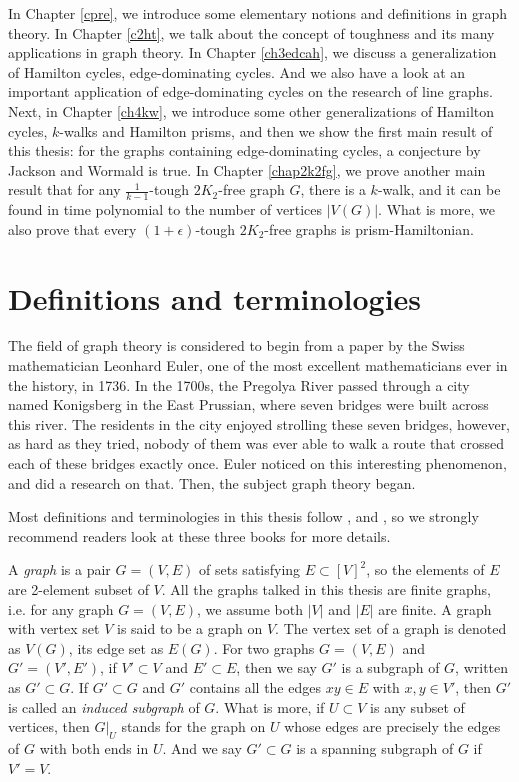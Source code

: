 \documentclass[12pt]{report}
\begin{document}
In Chapter \ref{cpre}, we introduce some elementary notions and definitions in graph theory. In Chapter \ref{c2ht}, we talk about the concept of toughness and its many applications in graph theory. In Chapter \ref{ch3edcah}, we discuss a generalization of Hamilton cycles, edge-dominating cycles. And we also have a look at an important application of edge-dominating cycles on the research of line graphs. Next, in Chapter \ref{ch4kw}, we introduce some other generalizations of Hamilton cycles, $k$-walks and Hamilton prisms, and then we show the first main result of this thesis: for the graphs containing edge-dominating cycles, a conjecture by Jackson and Wormald is true. In Chapter \ref{chap2k2fg}, we prove another main result that for any $\frac{1}{k-1}$-tough $2K_2$-free graph $G$, there is a $k$-walk, and it can be found in time polynomial to the number of vertices $|V(G)|$. What is more, we also prove that every $(1+\epsilon)$-tough $2K_2$-free graphs is prism-Hamiltonian.

\section{Definitions and terminologies}
The field of graph theory is considered to begin from a paper \cite{euler1741solutio} by the Swiss mathematician Leonhard Euler, one of the most excellent mathematicians ever in the history, in 1736. In the 1700s, the Pregolya River passed through a city named Konigsberg in the East Prussian, where seven bridges were built across this river. The residents in the city enjoyed strolling these seven bridges, however, as hard as they tried, nobody of them was ever able to walk a route that crossed each of these bridges exactly once. Euler noticed on this interesting phenomenon, and did a research on that. Then, the subject graph theory began.



Most definitions and terminologies in this thesis follow \cite{harris2008combinatorics}, \cite{bomu08} and \cite{diestel2000graph}, so we strongly recommend readers look at these three books for more details.

A {\em graph} is a pair $G=(V,E)$ of sets satisfying $E\subset[V]^2$, so the elements of $E$ are 2-element subset of $V$. All the graphs talked in this thesis are finite graphs, i.e. for any graph $G=(V,E)$, we assume both $|V|$ and $|E|$ are finite. A graph with vertex set $V$ is said to be a graph on $V$. The vertex set of a graph is denoted as $V(G)$, its edge set as $E(G)$.
For two graphs $G=(V,E)$ and $G'=(V',E')$, if $V'\subset V$ and $E'\subset E$, then we say $G'$ is a subgraph of $G$, written as $G'\subset G$. 
If $G'\subset G$ and $G'$ contains all the edges $xy\in E$ with $x,y\in V'$, then $G'$ is called an {\em induced subgraph} of $G$. What is more, if $U\subset V$ is any subset of vertices, then $G|_U$ stands for the graph on $U$ whose edges are precisely the edges of $G$ with both ends in $U$. And we say $G'\subset G$ is a spanning subgraph of $G$ if $V'=V$.
\end{document}
